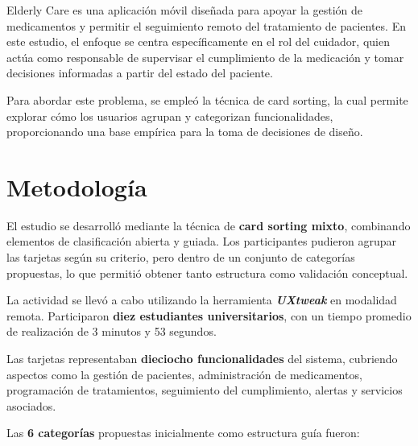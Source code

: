 \documentclass[11pt]{article}
\begin{document}
Elderly Care es una aplicación móvil diseñada para apoyar la gestión de medicamentos y permitir el seguimiento remoto del tratamiento de pacientes. En este estudio, el enfoque se centra específicamente en el rol del cuidador, quien actúa como responsable de supervisar el cumplimiento de la medicación y tomar decisiones informadas a partir del estado del paciente.

Para abordar este problema, se empleó la técnica de card sorting, la cual permite explorar cómo
los usuarios agrupan y categorizan funcionalidades, proporcionando una base empírica para la toma
de decisiones de diseño.

\section{Metodología}

El estudio se desarrolló mediante la técnica de \textbf{card sorting mixto}, combinando elementos
de clasificación abierta y guiada. Los participantes pudieron agrupar las tarjetas según su
criterio, pero dentro de un conjunto de categorías propuestas, lo que permitió obtener tanto
estructura como validación conceptual.

La actividad se llevó a cabo utilizando la herramienta \textit{\textbf{UXtweak}} en modalidad remota.
Participaron \textbf{diez estudiantes universitarios}, con un tiempo promedio de realización de
3 minutos y 53 segundos.

Las tarjetas representaban \textbf{dieciocho funcionalidades} del sistema, cubriendo aspectos
como la gestión de pacientes, administración de medicamentos, programación de tratamientos,
seguimiento del cumplimiento, alertas y servicios asociados.

\vspace{6pt}
\noindent Las \textbf{6 categorías} propuestas inicialmente como estructura guía fueron:
\end{document}
